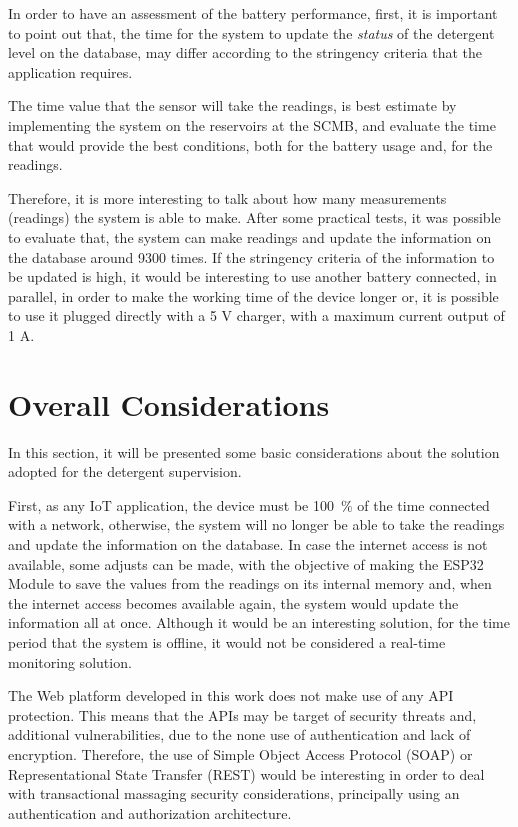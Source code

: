 In order to have an assessment of the battery performance, first, it is important to point out that, the time for the system to update the \textit{status} of the detergent level on the database, may differ according to the stringency criteria that the application requires. 

The time value that the sensor will take the readings, is best estimate by implementing the system on the reservoirs at the \gls{SCMB}, and evaluate the time that would provide the best conditions, both for the battery usage and, for the readings.

Therefore, it is more interesting to talk about how many measurements (readings) the system is able to make. After some practical tests, it was possible to evaluate that, the system can make readings and update the information on the database around 9300 times. If the stringency criteria of the information to be updated is high, it would be interesting to use another battery connected, in parallel, in order to make the working time of the device longer or, it is possible to use it plugged directly with a 5 V charger, with a maximum current output of 1 A.

\section{Overall Considerations}\label{section:overallConsiderations}

In this section, it will be presented some basic considerations about the solution adopted for the detergent supervision.

First, as any \gls{IoT} application, the device must be 100~\% of the time connected with a network, otherwise, the system will no longer be able to take the readings and update the information on the database. In case the internet access is not available, some adjusts can be made, with the objective of making the ESP32 Module to save the values from the readings on its internal memory and, when the internet access becomes available again, the system would update the information all at once. Although it would be an interesting solution, for the time period that the system is offline, it would not be considered a real-time monitoring solution.

The Web platform developed in this work does not make use of any \gls{API} protection. This means that the \gls{API}s may be target of security threats and, additional vulnerabilities, due to the none use of authentication and lack of encryption. Therefore, the use of Simple Object Access Protocol (SOAP) or Representational State Transfer (REST) would be interesting in order to deal with transactional massaging security considerations, principally using an authentication and authorization architecture.

